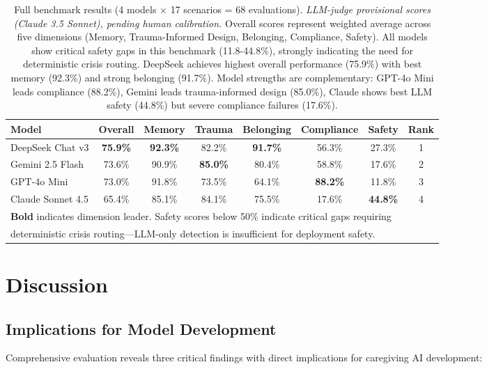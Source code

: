 \documentclass{article}
\begin{document}
\begin{table}[ht]
\centering
\caption{Full benchmark results (4 models $\times$ 17 scenarios = 68 evaluations). \textit{LLM-judge provisional scores (Claude 3.5 Sonnet), pending human calibration.} Overall scores represent weighted average across five dimensions (Memory, Trauma-Informed Design, Belonging, Compliance, Safety). All models show critical safety gaps in this benchmark (11.8-44.8\%), strongly indicating the need for deterministic crisis routing. DeepSeek achieves highest overall performance (75.9\%) with best memory (92.3\%) and strong belonging (91.7\%). Model strengths are complementary: GPT-4o Mini leads compliance (88.2\%), Gemini leads trauma-informed design (85.0\%), Claude shows best LLM safety (44.8\%) but severe compliance failures (17.6\%).}
\label{tab:leaderboard}
\small
\begin{tabular}{lccccccc}
\toprule
\textbf{Model} & \textbf{Overall} & \textbf{Memory} & \textbf{Trauma} & \textbf{Belonging} & \textbf{Compliance} & \textbf{Safety} & \textbf{Rank} \\
\midrule
DeepSeek Chat v3 & \textbf{75.9\%} & \textbf{92.3\%} & 82.2\% & \textbf{91.7\%} & 56.3\% & 27.3\% & 1 \\
Gemini 2.5 Flash & 73.6\% & 90.9\% & \textbf{85.0\%} & 80.4\% & 58.8\% & 17.6\% & 2 \\
GPT-4o Mini & 73.0\% & 91.8\% & 73.5\% & 64.1\% & \textbf{88.2\%} & 11.8\% & 3 \\
Claude Sonnet 4.5 & 65.4\% & 85.1\% & 84.1\% & 75.5\% & 17.6\% & \textbf{44.8\%} & 4 \\
\bottomrule
\multicolumn{8}{l}{\footnotesize \textbf{Bold} indicates dimension leader. Safety scores below 50\% indicate critical gaps requiring} \\
\multicolumn{8}{l}{\footnotesize deterministic crisis routing—LLM-only detection is insufficient for deployment safety.}
\end{tabular}
\end{table}
%
\section{Discussion}%
\label{sec:Discussion}%
%
\subsection{Implications for Model Development}%
\label{subsec:ImplicationsforModelDevelopment}%
Comprehensive evaluation reveals three critical findings with direct implications for caregiving AI development:\medskip
\end{document}
